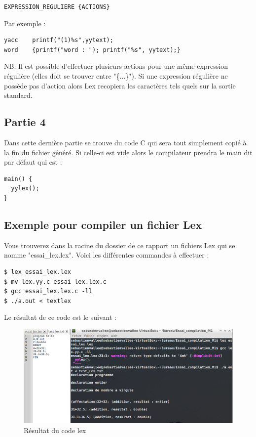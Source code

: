 \begin{verbatim}
EXPRESSION_REGULIERE {ACTIONS}
\end{verbatim}

Par exemple :

\begin{verbatim}
yacc    printf("(1)%s",yytext);
word    {printf("word : "); printf("%s", yytext);} 
\end{verbatim}

NB: Il est possible d'effectuer plusieurs actions pour une même expression régulière (elles doit se trouver entre "\{...\}"). Si une expression régulière ne possède pas d'action alors Lex recopiera les caractères tels quels sur la sortie standard.

\subsection{Partie 4}
Dans cette dernière partie se trouve du code C qui sera tout simplement copié à la fin du fichier généré. Si celle-ci est vide alors le compilateur prendra le main dit par défaut qui est :
\begin{verbatim}
main() {
  yylex();
}
\end{verbatim}

\subsection{Exemple pour compiler un fichier Lex} 
Vous trouverez dans la racine du dossier de ce rapport un fichiers Lex qui se nomme "essai\_lex.lex". Voici les différentes commandes à effectuer :

\begin{verbatim}
$ lex essai_lex.lex
$ mv lex.yy.c essai_lex.lex.c
$ gcc essai_lex.lex.c -ll
$ ./a.out < textlex
\end{verbatim}


Le résultat de ce code est le suivant :

\begin{figure}[h]
    \centerline{\includegraphics[scale=0.6]{data/lex}}
    \caption{Résultat du code lex}
    \label{fig:lex}
\end{figure}

